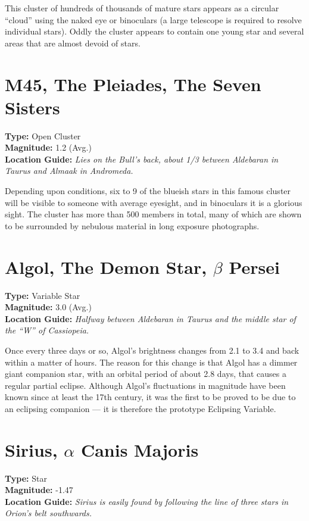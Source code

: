 This cluster of hundreds of thousands of mature stars appears as
a circular ``cloud'' using the naked eye or binoculars (a large
telescope is required to resolve individual stars). Oddly the cluster
appears to contain one young star and several areas that are almost
devoid of stars.

\section{M45, The Pleiades, The Seven Sisters}
\textbf{Type:} Open Cluster \\
\textbf{Magnitude:} 1.2 (Avg.) \\
\textbf{Location Guide:} \textit{Lies on the Bull's back, about 1/3 between Aldebaran in Taurus and Almaak in Andromeda.} 

Depending upon conditions, six to 9 of the blueish stars in this
famous cluster will be visible to someone with average eyesight, and in
binoculars it is a glorious sight. The cluster has more than 500
members in total, many of which are shown to be surrounded by nebulous
material in long exposure photographs.

\section{Algol, The Demon Star, \texorpdfstring{$\beta$}{beta} Persei}
\textbf{Type:} Variable Star \\
\textbf{Magnitude:} 3.0 (Avg.) \\
\textbf{Location Guide:} \textit{Halfway between Aldebaran in Taurus and the middle star of the ``W'' of Cassiopeia.}

Once every three days or so, Algol's brightness changes from 2.1 to 3.4
and back within a matter of hours. The reason for this change is that
Algol has a dimmer giant companion star, with an orbital period of
about 2.8 days, that causes a regular partial eclipse. Although
Algol's fluctuations in magnitude have been known since at least the
17th century, it was the first to be proved to be due to an eclipsing
companion --- it is therefore the prototype Eclipsing Variable.

\section{Sirius, \texorpdfstring{$\alpha$}{alpha} Canis Majoris}
\textbf{Type:} Star \\
\textbf{Magnitude:} -1.47 \\
\textbf{Location Guide:} \textit{Sirius is easily found by following the line of three stars in Orion's belt southwards.} 

